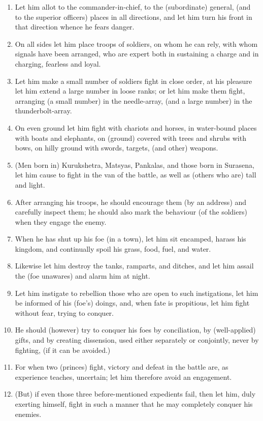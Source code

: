 \begin{enumerate}
\item Let him allot to the commander-in-chief, to the (subordinate) general, (and to the superior officers) places in all directions, and let him turn his front in that direction whence he fears danger.
\item On all sides let him place troops of soldiers, on whom he can rely, with whom signals have been arranged, who are expert both in sustaining a charge and in charging, fearless and loyal.
\item Let him make a small number of soldiers fight in close order, at his pleasure let him extend a large number in loose ranks; or let him make them fight, arranging (a small number) in the needle-array, (and a large number) in the thunderbolt-array.
\item On even ground let him fight with chariots and horses, in water-bound places with boats and elephants, on (ground) covered with trees and shrubs with bows, on hilly ground with swords, targets, (and other) weapons.
\item (Men born in) Kurukshetra, Matsyas, Pankalas, and those born in Surasena, let him cause to fight in the van of the battle, as well as (others who are) tall and light.
\item After arranging his troops, he should encourage them (by an address) and carefully inspect them; he should also mark the behaviour (of the soldiers) when they engage the enemy.
\item When he has shut up his foe (in a town), let him sit encamped, harass his kingdom, and continually spoil his grass, food, fuel, and water.
\item Likewise let him destroy the tanks, ramparts, and ditches, and let him assail the (foe unawares) and alarm him at night.
\item Let him instigate to rebellion those who are open to such instigations, let him be informed of his (foe's) doings, and, when fate is propitious, let him fight without fear, trying to conquer.
\item He should (however) try to conquer his foes by conciliation, by (well-applied) gifts, and by creating dissension, used either separately or conjointly, never by fighting, (if it can be avoided.)
\item For when two (princes) fight, victory and defeat in the battle are, as experience teaches, uncertain; let him therefore avoid an engagement.
\item (But) if even those three before-mentioned expedients fail, then let him, duly exerting himself, fight in such a manner that he may completely conquer his enemies.

\end{enumerate}
